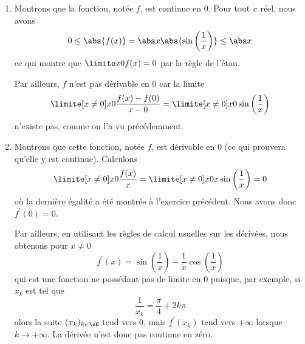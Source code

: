 \begin{example}
\begin{enumerate}
\item
Montrons que la fonction, notée $f$, est continue en $0$. Pour tout $x$ réel, nous avons
\begin{equation*}
  0 \leq \abs{f(x)} = \abs x \abs{\sin \left(\frac 1 x\right)} \leq
  \abs x
\end{equation*}
ce qui montre que $\limite x 0 f(x) = 0$ par la règle de l'étau.

Par ailleurs, $f$ n'est pas dérivable en $0$ car la limite
\begin{equation*}
  \limite[x \neq 0] x 0 \frac{f(x) - f(0)}{x-0} = \limite[x\neq 0] x 0 \sin\left(\frac{1}{x}\right)
\end{equation*}
n'existe pas, comme on l'a vu précédemment.

\item
Montrons que cette fonction, notée $f$, est
dérivable en $0$ (ce qui prouvera qu'elle y est continue). Calculons
\begin{equation*}
  \limite[x \neq 0] x 0 \frac{f(x)}{x} = \limite[x\neq 0] x 0 x \sin
  \left(
    \frac 1 x
  \right) = 0
\end{equation*}
où la dernière égalité a été montrée à l'exercice précédent. Nous
avons donc $f^\prime(0) = 0$.

Par ailleurs, en utilisant les règles de calcul usuelles sur les
dérivées, nous obtenons pour $x \neq 0$
\begin{equation*}
  f^\prime(x) = \sin
  \left(
    \frac 1 x
  \right) - \frac 1 x \cos
  \left(
    \frac 1 x
  \right)
\end{equation*}
qui est une fonction ne possédant pas de limite en $0$ puisque, par exemple,
si $x_k$ est tel que
\begin{equation*}
  \frac 1{x_k} = \frac\pi4 + 2k\pi
\end{equation*}
alors la suite $(x_k)_{k\in\eN}$ tend vers $0$, mais $f^\prime(x_k)$ tend vers $+\infty$ lorsque $k \rightarrow +\infty$. La dérivée n'est donc pas continue en zéro.

\end{enumerate}

\end{example}



